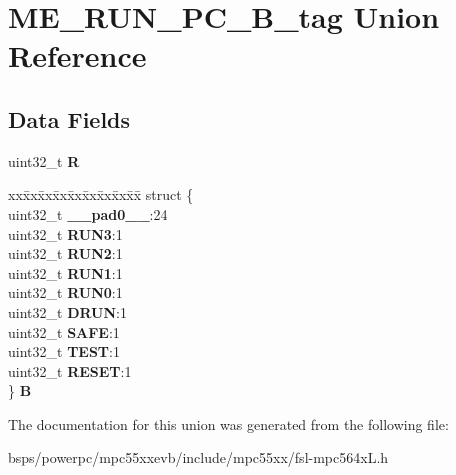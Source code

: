\hypertarget{unionME__RUN__PC__32B__tag}{}\section{M\+E\+\_\+\+R\+U\+N\+\_\+\+P\+C\+\_\+B\+\_\+tag Union Reference}
\label{unionME__RUN__PC__32B__tag}
\subsection*{Data Fields}
\begin{DoxyCompactItemize}
\item 
\mbox{\label{unionME__RUN__PC__32B__tag_a0ea43e6bc828a26810d1dca8a5dc72ed}} 
uint32\+\_\+t {\bfseries R}
\item 
\mbox{\label{unionME__RUN__PC__32B__tag_ab2eba1240b898768918eece724d66856}} 
\begin{tabbing}
xx\=xx\=xx\=xx\=xx\=xx\=xx\=xx\=xx\=\kill
struct \{\\
\>uint32\_t {\bfseries \_\_pad0\_\_}:24\\
\>uint32\_t {\bfseries RUN3}:1\\
\>uint32\_t {\bfseries RUN2}:1\\
\>uint32\_t {\bfseries RUN1}:1\\
\>uint32\_t {\bfseries RUN0}:1\\
\>uint32\_t {\bfseries DRUN}:1\\
\>uint32\_t {\bfseries SAFE}:1\\
\>uint32\_t {\bfseries TEST}:1\\
\>uint32\_t {\bfseries RESET}:1\\
\} {\bfseries B}\\

\end{tabbing}\end{DoxyCompactItemize}


The documentation for this union was generated from the following file\+:\begin{DoxyCompactItemize}
\item 
bsps/powerpc/mpc55xxevb/include/mpc55xx/fsl-\/mpc564x\+L.\+h\end{DoxyCompactItemize}
